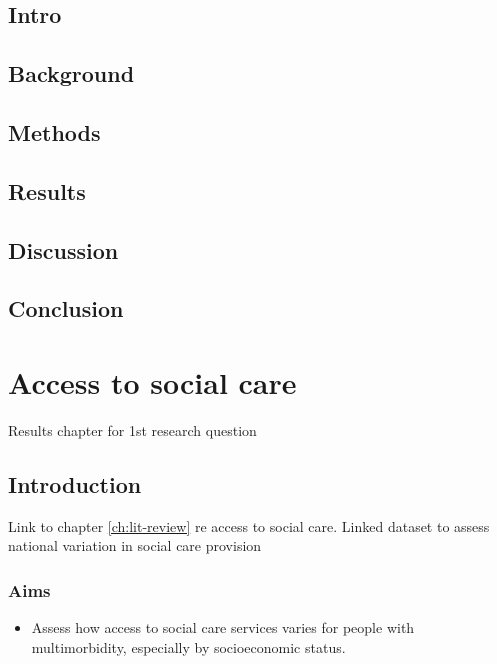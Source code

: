 \documentclass[12pt,]{report}
\begin{document}
\section{Intro}\label{sec:qual-intro}

\section{Background}\label{sec:qual-background}

\section{Methods}\label{sec:qual-methods}

\section{Results}\label{sec:qual-results}

\section{Discussion}\label{sec:qual-discuss}

\section{Conclusion}\label{sec:qual-concl}

\FloatBarrier
\newpage
{}

\chapter{Access to social care}\label{ch:social-care}

Results chapter for 1st research question

\section{Introduction}\label{sec:social-care-intro}

Link to chapter \ref{ch:lit-review} re access to social care. Linked
dataset to assess national variation in social care provision

\subsection{Aims}\label{subsec:social-care-aims}

\begin{itemize}[noitemsep]
\item Assess how access to social care services varies for people with multimorbidity, especially by socioeconomic status.
\end{itemize}
\end{document}
